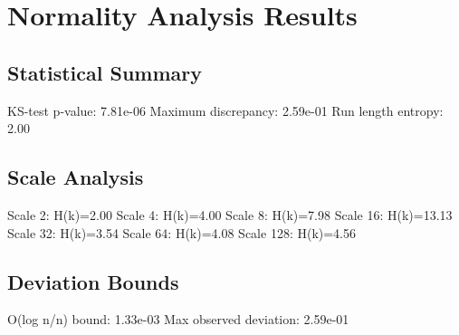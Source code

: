 \section{Normality Analysis Results}

\subsection{Statistical Summary}
KS-test p-value: 7.81e-06
Maximum discrepancy: 2.59e-01
Run length entropy: 2.00

\subsection{Scale Analysis}
Scale 2: H(k)=2.00
Scale 4: H(k)=4.00
Scale 8: H(k)=7.98
Scale 16: H(k)=13.13
Scale 32: H(k)=3.54
Scale 64: H(k)=4.08
Scale 128: H(k)=4.56
\subsection{Deviation Bounds}
O(log n/n) bound: 1.33e-03
Max observed deviation: 2.59e-01
